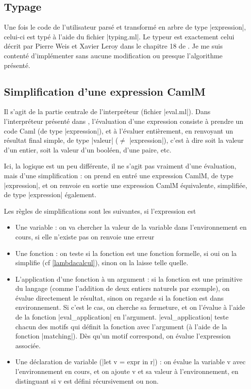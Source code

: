 \documentclass[a4paper, 12pt]{article}
\begin{document}
\subsection{Typage}
Une fois le code de l'utilisateur parsé et transformé en arbre de type |expression|, celui-ci est typé à l'aide du fichier |typing.ml|.
Le typeur est exactement celui décrit par Pierre Weis et Xavier Leroy dans le chapitre 18 de \cite{LLC}. Je me suis contenté d'implémenter sans aucune modification ou presque l'algorithme présenté.

\subsection{Simplification d'une expression CamlM}
Il s'agit de la partie centrale de l'interpréteur (fichier |eval.ml|).
Dans l'interpréteur présenté dans \cite{LLC}, l'évaluation d'une expression consiste à prendre un code Caml (de type |expression|), et à l'évaluer entièrement, en renvoyant un résultat final simple, de type |valeur| ($\neq$ |expression|), c'est à dire soit la valeur d'un entier, soit la valeur d'un booléen, d'une paire, etc.

Ici, la logique est un peu différente, il ne s'agit pas vraiment d'une évaluation, mais d'une simplification : on prend en entré une expression CamlM, de type |expression|, et on renvoie en sortie une expression CamlM équivalente, simplifiée, de type |expression| également.

Les règles de simplifications sont les suivantes, si l'expression est
\begin{itemize}
\item Une variable : on va chercher la valeur de la variable dans l'environnement en cours, si elle n'existe pas on renvoie une erreur
\item Une fonction : on teste si la fonction est une fonction formelle, si oui on la simplifie (cf \ref{lambdacalcul}), sinon on la laisse telle quelle.
\item L'application d'une fonction à un argument : si la fonction est une primitive du langage (comme l'addition de deux entiers naturels par exemple), on évalue directement le résultat, sinon on regarde si la fonction est dans environnement. Si c'est le cas, on cherche sa fermeture, et on l'évalue à l'aide de la fonction |eval_application| en l'argument.
|eval_application| teste chacun des motifs qui définit la fonction avec l'argument (à l'aide de la fonction |matching|). Dès qu'un motif correspond, on évalue l'expression associée.
\item Une déclaration de variable (|let v = expr in r|) : on évalue la variable v avec l'environnement en cours, et on ajoute v et sa valeur à l'environnement, en distinguant si v est défini récursivement ou non.
\end{itemize}
\end{document}
